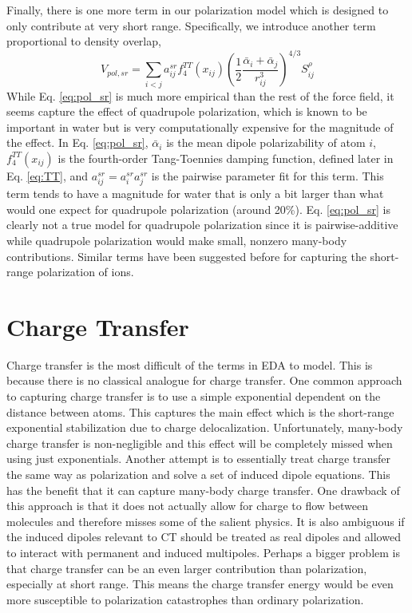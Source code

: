 \documentclass[journal=jacsat,manuscript=article]{achemso}
\begin{document}
Finally, there is one more term in our polarization model which is designed to only contribute at very
short range. Specifically, we introduce another term proportional to density overlap,
\begin{equation}
  V_{pol,sr}=\sum_{i<j}a_{ij}^{sr}f_4^{TT}(x_{ij})\left(\frac{1}{2}\frac{\bar{\alpha}_i + \bar{\alpha}_j}{r_{ij}^3}\right)^{4/3}S_{ij}^{\rho}
\label{eq:pol_sr}
\end{equation}
\noindent
While Eq. \ref{eq:pol_sr} is much more empirical than the rest of the force field,
it seems capture the effect of quadrupole polarization, which is known to be important
in water\cite{herman2023accurate} but is very computationally expensive for the magnitude of the effect.
In Eq. \ref{eq:pol_sr}, $\bar{\alpha}_i$ is the mean dipole polarizability of atom $i$, $f_4^{TT}(x_{ij})$
is the fourth-order Tang-Toennies damping function, defined later in Eq. \ref{eq:TT}, and $a_{ij}^{sr}=a_{i}^{sr}a_{j}^{sr}$ is
the pairwise parameter fit for this term. This term tends to have a magnitude for water
that is only a bit larger than what would one expect for quadrupole polarization (around 20\%). Eq. \ref{eq:pol_sr} is clearly
not a true model for quadrupole polarization since it is pairwise-additive
while quadrupole polarization would make small, nonzero many-body contributions. Similar terms
have been suggested before for capturing the short-range polarization of ions.\cite{sheng2022semiempirical}

\section*{Charge Transfer}
Charge transfer is the most difficult of the terms in EDA to model. This is
because there is no classical analogue for charge transfer. One common approach to
capturing charge transfer is to use a simple exponential dependent on the distance
between atoms.\cite{rackers2021polarizable} This captures the main effect which is the
short-range exponential stabilization due to charge delocalization. Unfortunately,
many-body charge transfer is non-negligible and this effect will be completely
missed when using just exponentials. Another attempt is to essentially treat
charge transfer the same way as polarization and solve a set of induced dipole equations.\cite{das2019development,wang2023general}
This has the benefit that it can capture many-body charge transfer. One drawback of this
approach is that it does not actually allow for charge to flow between molecules
and therefore misses some of the salient physics. It is also ambiguous if the induced
dipoles relevant to CT should be treated as real dipoles and allowed to interact 
with permanent and induced multipoles. Perhaps a bigger problem is that
charge transfer can be an even larger contribution than polarization, especially at short range.
This means the charge transfer energy would be even more susceptible to
polarization catastrophes than ordinary polarization.
\end{document}
